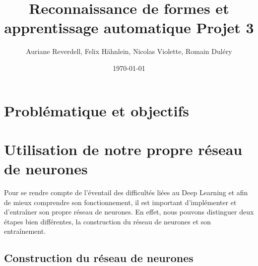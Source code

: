 \documentclass[a4paper,11pt]{article}
\title{Reconnaissance de formes et apprentissage automatique Projet 3}
\author{Auriane Reverdell, Felix Hähnlein, Nicolas Violette, Romain Duléry}
\date{\today}
\begin{document}
\maketitle
\vspace{1cm}

\section{Problématique et objectifs}

\section{Utilisation de notre propre réseau de neurones}

    Pour se rendre compte de l'éventail des difficultés liées au Deep Learning et afin de mieux comprendre son fonctionnement, il est important d'implémenter et d'entraîner son propre réseau de neurones.
    En effet, nous pouvons distinguer deux étapes bien différentes, la construction du réseau de neurones et son entraînement.

\subsection{Construction du réseau de neurones}
    
\end{document}
